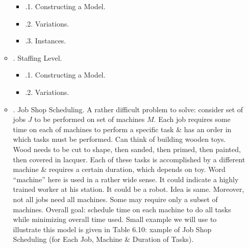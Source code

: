 \documentclass{article}
\begin{document}
\begin{itemize}
\begin{itemize}
        \begin{itemize}
            \item {.1. Constructing a Model.}
            \item {.2. Variations.}
            \item {.3. Instances.}
        \end{itemize}
        \item {. Staffing Level.}
        \begin{itemize}
            \item {.1. Constructing a Model.}
            \item {.2. Variations.}
        \end{itemize}
        \item {. Job Shop Scheduling.} A rather difficult problem to solve: consider set of jobs $J$ to be performed on set of machines $M$. Each job requires some time on each of machines to perform a specific task \& has an order in which tasks must be performed. Can think of building wooden toys. Wood needs to be cut to shape, then sanded, then primed, then painted, then covered in lacquer. Each of these tasks is accomplished by a different machine \& requires a certain duration, which depends on toy. Word ``machine'' here is used in a rather wide sense. It could indicate a highly trained worker at his station. It could be a robot. Idea is same. Moreover, not all jobs need all machines. Some may require only a subset of machines. Overall goal: schedule time on each machine to do all tasks while minimizing overall time used. Small example we will use to illustrate this model is given in {\sf Table 6.10: xample of Job Shop Scheduling (for Each Job, Machine \& Duration of Tasks).}


\end{itemize}
\end{itemize}
\end{document}
